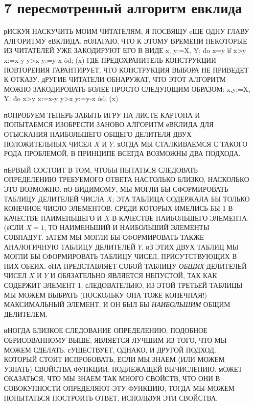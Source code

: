 
\chapter{7 пересмотренный алгоритм евклида}
рИСКУЯ НАСКУЧИТЬ МОИМ ЧИТАТЕЛЯМ, Я ПОСВЯЩУ eЩЕ ОДНУ ГЛАВУ АЛГОРИТМУ 
еВКЛИДА. пОЛАГАЮ, ЧТО К ЭТОМУ ВРЕМЕНИ НЕКОТОРЫЕ ИЗ ЧИТАТЕЛЕЙ УЖЕ 
ЗАКОДИРУЮТ ЕГО В ВИДЕ
\prg
x, y:=X, Y;
\.{do} x\not=y \to \.{if} x>y \to x:=x-y
 \wbox y>x \to y:=y-x
\.{od};
(x)
\grp
ГДЕ ПРЕДОХРАНИТЕЛЬ КОНСТРУКЦИИ ПОВТОРЕНИЯ ГАРАНТИРУЕТ, ЧТО 
КОНСТРУКЦИЯ ВЫБОРА НЕ ПРИВЕДЕТ К ОТКАЗУ. дРУГИЕ ЧИТАТЕЛИ ОБНАРУЖАТ, 
ЧТО ЭТОТ АЛГОРИТМ МОЖНО ЗАКОДИРОВАТЬ БОЛЕЕ ПРОСТО СЛЕДУЮЩИМ 
ОБРАЗОМ:
\prg
x,y:=X, Y;
\.{do} x>y \to x:=x-y
 \wbox y>x \to y:=y-x
\.{od};
(x)
\grp

пОПРОБУЕМ ТЕПЕРЬ ЗАБЫТЬ ИГРУ НА ЛИСТЕ КАРТОНА И  ПОПЫТАЕМСЯ 
ИЗОБРЕСТИ ЗАНОВО АЛГОРИТМ еВКЛИДА ДЛЯ ОТЫСКАНИЯ НАИБОЛЬШЕГО ОБЩЕГО 
ДЕЛИТЕЛЯ ДВУХ ПОЛОЖИТЕЛЬНЫХ ЧИСЕЛ $X$ И $Y$. кОГДА МЫ СТАЛКИВАЕМСЯ 
С ТАКОГО РОДА ПРОБЛЕМОЙ, В  ПРИНЦИПЕ ВСЕГДА ВОЗМОЖНЫ ДВА ПОДХОДА.

пЕРВЫЙ СОСТОИТ В ТОМ, ЧТОБЫ ПЫТАТЬСЯ СЛЕДОВАТЬ ОПРЕДЕЛЕНИЮ 
ТРЕБУЕМОГО ОТВЕТА НАСТОЛЬКО БЛИЗКО, НАСКОЛЬКО ЭТО ВОЗМОЖНО. 
пО-ВИДИМОМУ, МЫ МОГЛИ БЫ СФОРМИРОВАТЬ ТАБЛИЦУ ДЕЛИТЕЛЕЙ ЧИСЛА $X$; 
ЭТА ТАБЛИЦА СОДЕРЖАЛА БЫ ТОЛЬКО КОНЕЧНОЕ ЧИСЛО ЭЛЕМЕНТОВ, СРЕДИ 
КОТОРЫХ ИМЕЛИСЬ БЫ 1 В КАЧЕСТВЕ НАИМЕНЬШЕГО И $X$ В КАЧЕСТВЕ 
НАИБОЛЬШЕГО ЭЛЕМЕНТА. (еСЛИ $X=1$, ТО НАИМЕНЬШИЙ И НАИБОЛЬШИЙ 
ЭЛЕМЕНТЫ СОВПАДУТ. зАТЕМ МЫ МОГЛИ БЫ СФОРМИРОВАТЬ ТАКЖЕ АНАЛОГИЧНУЮ 
ТАБЛИЦУ ДЕЛИТЕЛЕЙ $Y$. иЗ ЭТИХ ДВУХ ТАБЛИЦ МЫ МОГЛИ БЫ СФОРМИРОВАТЬ 
ТАБЛИЦУ ЧИСЕЛ, ПРИСУТСТВУЮЩИХ В НИХ ОБЕИХ. оНА ПРЕДСТАВЛЯЕТ СОБОЙ 
ТАБЛИЦУ \emph{ОБЩИХ} ДЕЛИТЕЛЕЙ ЧИСЕЛ $X$ И $Y$ И ОБЯЗАТЕЛЬНО 
ЯВЛЯЕТСЯ НЕПУСТОЙ, ТАК КАК СОДЕРЖИТ ЭЛЕМЕНТ 1. сЛЕДОВАТЕЛЬНО, ИЗ 
ЭТОЙ ТРЕТЬЕЙ ТАБЛИЦЫ МЫ МОЖЕМ ВЫБРАТЬ (ПОСКОЛЬКУ ОНА ТОЖЕ 
КОНЕЧНАЯ!) МАКСИМАЛЬНЫЙ ЭЛЕМЕНТ, И ОН БЫЛ БЫ  \emph{НАИБОЛЬШИМ} 
ОБЩИМ ДЕЛИТЕЛЕМ.

иНОГДА БЛИЗКОЕ СЛЕДОВАНИЕ ОПРЕДЕЛЕНИЮ, ПОДОБНОЕ ОБРИСОВАННОМУ ВЫШЕ, 
ЯВЛЯЕТСЯ ЛУЧШИМ ИЗ ТОГО, ЧТО МЫ МОЖЕМ СДЕЛАТЬ. сУЩЕСТВУЕТ, ОДНАКО, 
И ДРУГОЙ ПОДХОД, КОТОРЫЙ СТОИТ ИСПРОБОВАТЬ, ЕСЛИ МЫ ЗНАЕМ (ИЛИ 
МОЖЕМ УЗНАТЬ) СВОЙСТВА ФУНКЦИИ, ПОДЛЕЖАЩЕЙ ВЫЧИСЛЕНИЮ. мОЖЕТ 
ОКАЗАТЬСЯ, ЧТО МЫ ЗНАЕМ ТАК МНОГО СВОЙСТВ, ЧТО ОНИ В СОВОКУПНОСТИ 
ОПРЕДЕЛЯЮТ ЭТУ ФУНКЦИЮ, ТОГДА МЫ МОЖЕМ ПОПЫТАТЬСЯ ПОСТРОИТЬ ОТВЕТ, 
ИСПОЛЬЗУЯ ЭТИ СВОЙСТВА.

